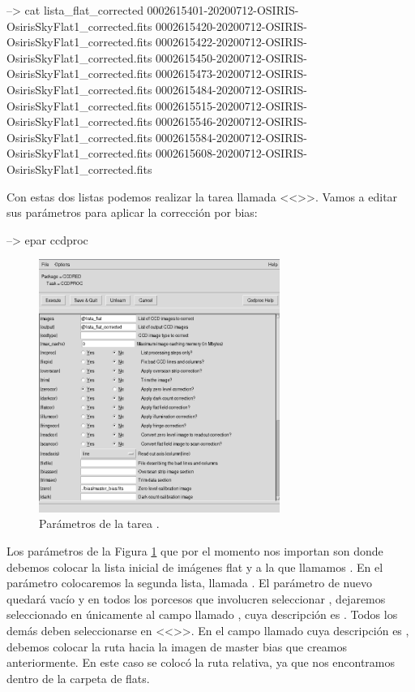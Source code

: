 \begin{shell}
--> cat lista_flat_corrected
0002615401-20200712-OSIRIS-OsirisSkyFlat1_corrected.fits
0002615420-20200712-OSIRIS-OsirisSkyFlat1_corrected.fits
0002615422-20200712-OSIRIS-OsirisSkyFlat1_corrected.fits
0002615450-20200712-OSIRIS-OsirisSkyFlat1_corrected.fits
0002615473-20200712-OSIRIS-OsirisSkyFlat1_corrected.fits
0002615484-20200712-OSIRIS-OsirisSkyFlat1_corrected.fits
0002615515-20200712-OSIRIS-OsirisSkyFlat1_corrected.fits
0002615546-20200712-OSIRIS-OsirisSkyFlat1_corrected.fits
0002615584-20200712-OSIRIS-OsirisSkyFlat1_corrected.fits
0002615608-20200712-OSIRIS-OsirisSkyFlat1_corrected.fits
\end{shell}

Con estas dos listas podemos realizar la tarea llamada <<>>. Vamos a editar sus parámetros para aplicar la corrección por bias:

\begin{shell}
--> epar ccdproc
\end{shell}

\begin{figure}[htb]
  \centering
	\includegraphics[width=0.7\textwidth]{figures/pyraf-correct-flat.png}
	\caption{Parámetros de la tarea .}
	\label{fig:pyraf-correct-flat} 
\end{figure}

Los parámetros de la Figura \ref{fig:pyraf-correct-flat} que por el momento nos importan son  donde debemos colocar la lista inicial de imágenes flat y a la que llamamos . En el parámetro  colocaremos la segunda lista, llamada . El parámetro  de nuevo quedará vacío y en todos los porcesos que involucren seleccionar , dejaremos seleccionado en  únicamente al campo llamado , cuya descripción es . Todos los demás deben seleccionarse en <<>>. En el campo llamado  cuya descripción es , debemos colocar la ruta hacia la imagen de master bias que creamos anteriormente. En este caso se colocó la ruta relativa, ya que nos encontramos dentro de la carpeta de flats. 

